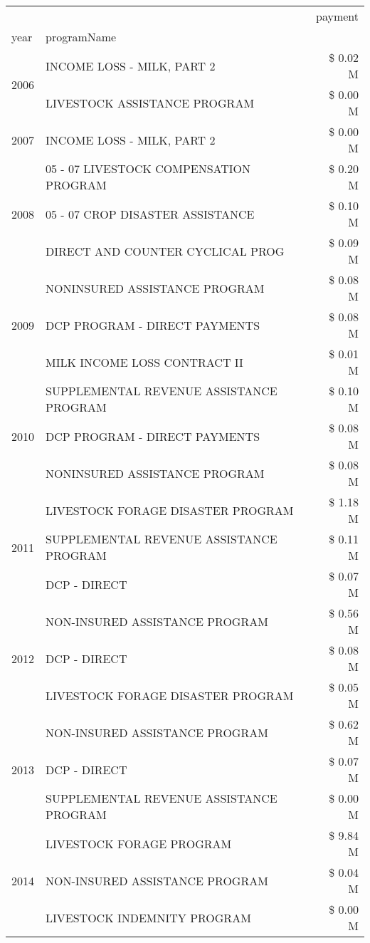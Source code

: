 \begin{tabular}{llr}
\toprule
 &  & payment \\
year & programName &  \\
\midrule
\multirow[t]{2}{*}{2006} & INCOME LOSS - MILK, PART 2 & \$ 0.02 M \\
 & LIVESTOCK ASSISTANCE PROGRAM & \$ 0.00 M \\
\cline{1-3}
2007 & INCOME LOSS - MILK, PART 2 & \$ 0.00 M \\
\cline{1-3}
\multirow[t]{3}{*}{2008} & 05 - 07 LIVESTOCK COMPENSATION PROGRAM & \$ 0.20 M \\
 & 05 - 07 CROP DISASTER ASSISTANCE & \$ 0.10 M \\
 & DIRECT AND COUNTER CYCLICAL PROG & \$ 0.09 M \\
\cline{1-3}
\multirow[t]{3}{*}{2009} & NONINSURED ASSISTANCE PROGRAM & \$ 0.08 M \\
 & DCP PROGRAM - DIRECT PAYMENTS & \$ 0.08 M \\
 & MILK INCOME LOSS CONTRACT II & \$ 0.01 M \\
\cline{1-3}
\multirow[t]{3}{*}{2010} & SUPPLEMENTAL REVENUE ASSISTANCE PROGRAM & \$ 0.10 M \\
 & DCP PROGRAM - DIRECT PAYMENTS & \$ 0.08 M \\
 & NONINSURED ASSISTANCE PROGRAM & \$ 0.08 M \\
\cline{1-3}
\multirow[t]{3}{*}{2011} & LIVESTOCK FORAGE DISASTER PROGRAM & \$ 1.18 M \\
 & SUPPLEMENTAL REVENUE ASSISTANCE PROGRAM & \$ 0.11 M \\
 & DCP - DIRECT & \$ 0.07 M \\
\cline{1-3}
\multirow[t]{3}{*}{2012} & NON-INSURED ASSISTANCE PROGRAM & \$ 0.56 M \\
 & DCP - DIRECT & \$ 0.08 M \\
 & LIVESTOCK FORAGE DISASTER PROGRAM & \$ 0.05 M \\
\cline{1-3}
\multirow[t]{3}{*}{2013} & NON-INSURED ASSISTANCE PROGRAM & \$ 0.62 M \\
 & DCP - DIRECT & \$ 0.07 M \\
 & SUPPLEMENTAL REVENUE ASSISTANCE PROGRAM & \$ 0.00 M \\
\cline{1-3}
\multirow[t]{3}{*}{2014} & LIVESTOCK FORAGE PROGRAM & \$ 9.84 M \\
 & NON-INSURED ASSISTANCE PROGRAM & \$ 0.04 M \\
 & LIVESTOCK INDEMNITY PROGRAM & \$ 0.00 M \\
\cline{1-3}

\end{tabular}
